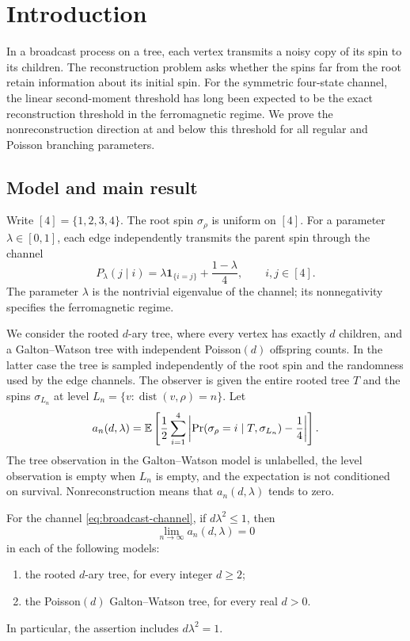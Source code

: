 \section{Introduction}\label{sec:introduction}

In a broadcast process on a tree, each vertex transmits a noisy copy of
its spin to its children. The reconstruction problem asks whether the
spins far from the root retain information about its initial spin.
For the symmetric four-state channel, the linear second-moment threshold
has long been expected to be the exact reconstruction threshold in the
ferromagnetic regime. We prove the nonreconstruction direction at and
below this threshold for all regular and Poisson branching parameters.

\subsection{Model and main result}
Write $[4]=\{1,2,3,4\}$. The root spin $\sigma_\rho$ is uniform on $[4]$.
For a parameter $\lambda\in[0,1]$, each edge independently transmits the
parent spin through the channel
\begin{equation}\label{eq:broadcast-channel}
 P_\lambda(j\mid i)
   =\lambda\mathbf 1_{\{i=j\}}+\frac{1-\lambda}{4},
 \qquad i,j\in[4].
\end{equation}
The parameter $\lambda$ is the nontrivial eigenvalue of the channel;
its nonnegativity specifies the ferromagnetic regime.

We consider the rooted $d$-ary tree, where every vertex has exactly $d$
children, and a Galton--Watson tree with independent Poisson$(d)$ offspring
counts. In the latter case the tree is sampled independently of the root
spin and the randomness used by the edge channels. The
observer is given the entire rooted tree $T$ and the spins
$\sigma_{L_n}$ at level $L_n=\{v:\operatorname{dist}(v,\rho)=n\}$.
Let
\begin{equation}\label{eq:advantage}
 a_n(d,\lambda)=
 \mathbb E\left[\frac12\sum_{i=1}^4
 \left|\Pr(\sigma_\rho=i\mid T,\sigma_{L_n})-\frac14\right|\right].
\end{equation}
The tree observation in the Galton--Watson model is unlabelled, the level
observation is empty when $L_n$ is empty, and the expectation is not
conditioned on survival. Nonreconstruction means that $a_n(d,\lambda)$
tends to zero.

\begin{theorem}\label{thm:main}
For the channel \eqref{eq:broadcast-channel}, if $d\lambda^2\leq1$, then
\[
 \lim_{n\to\infty}a_n(d,\lambda)=0
\]
in each of the following models:
\begin{enumerate}
 \item the rooted $d$-ary tree, for every integer $d\geq2$;
 \item the Poisson$(d)$ Galton--Watson tree, for every real $d>0$.
\end{enumerate}
In particular, the assertion includes $d\lambda^2=1$.
\end{theorem}


